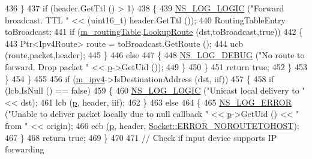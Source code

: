 \begin{DoxyCode}
436                 \}
437               \textcolor{keywordflow}{if} (header.GetTtl () > 1)
438                 \{
439                   \hyperlink{group__logging_ga88acd260151caf2db9c0fc84997f45ce}{NS\_LOG\_LOGIC} (\textcolor{stringliteral}{"Forward broadcast. TTL "} << (uint16\_t) header.GetTtl ());
440                   RoutingTableEntry toBroadcast;
441                   \textcolor{keywordflow}{if} (\hyperlink{classns3_1_1dsdv_1_1RoutingProtocol_acc4cee466c2591e35f508ce58097a00e}{m\_routingTable}.\hyperlink{classns3_1_1dsdv_1_1RoutingTable_a0bfb9dc677f02bd740973865e38df763}{LookupRoute} (dst,toBroadcast,\textcolor{keyword}{true}))
442                     \{
443                       Ptr<Ipv4Route> route = toBroadcast.GetRoute ();
444                       ucb (route,packet,header);
445                     \}
446                   \textcolor{keywordflow}{else}
447                     \{
448                       \hyperlink{group__logging_ga413f1886406d49f59a6a0a89b77b4d0a}{NS\_LOG\_DEBUG} (\textcolor{stringliteral}{"No route to forward. Drop packet "} << 
      \hyperlink{lte__link__budget_8m_ac9de518908a968428863f829398a4e62}{p}->GetUid ());
449                     \}
450                 \}
451               \textcolor{keywordflow}{return} \textcolor{keyword}{true};
452             \}
453         \}
454     \}
455 
456   \textcolor{keywordflow}{if} (\hyperlink{classns3_1_1dsdv_1_1RoutingProtocol_a955477c7f38e64762a264c24e3762af6}{m\_ipv4}->IsDestinationAddress (dst, iif))
457     \{
458       \textcolor{keywordflow}{if} (lcb.IsNull () == \textcolor{keyword}{false})
459         \{
460           \hyperlink{group__logging_ga88acd260151caf2db9c0fc84997f45ce}{NS\_LOG\_LOGIC} (\textcolor{stringliteral}{"Unicast local delivery to "} << dst);
461           lcb (\hyperlink{lte__link__budget_8m_ac9de518908a968428863f829398a4e62}{p}, header, iif);
462         \}
463       \textcolor{keywordflow}{else}
464         \{
465           \hyperlink{group__logging_ga0261a8db1d4ac5f79417d117634fd455}{NS\_LOG\_ERROR} (\textcolor{stringliteral}{"Unable to deliver packet locally due to null callback "} << 
      \hyperlink{lte__link__budget_8m_ac9de518908a968428863f829398a4e62}{p}->GetUid () << \textcolor{stringliteral}{" from "} << origin);
466           ecb (\hyperlink{lte__link__budget_8m_ac9de518908a968428863f829398a4e62}{p}, header, \hyperlink{classns3_1_1Socket_ada1328c5ae0c28cb2a982caf8f6d6ccaa0f8ecb5a4ddbce3bade35fa12c3d49e8}{Socket::ERROR\_NOROUTETOHOST});
467         \}
468       \textcolor{keywordflow}{return} \textcolor{keyword}{true};
469     \}
470 
471   \textcolor{comment}{// Check if input device supports IP forwarding}

\end{DoxyCode}
